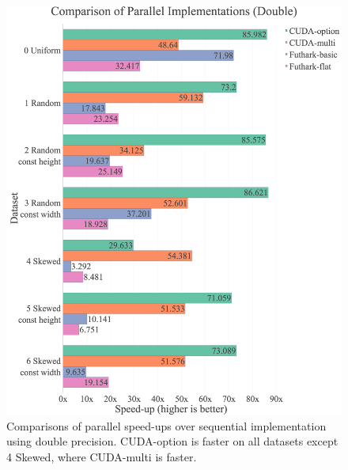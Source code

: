 \begin{figure}[H]
	\centering
	\caption{Comparisons of parallel speed-ups over sequential implementation using double precision. CUDA-option is faster on all datasets except 4 Skewed, where CUDA-multi is faster.}
    \label{fig:results:speedup-double}
    \includegraphics[width=1\textwidth]{img/experiments/all-approaches-double.png}
\end{figure}

